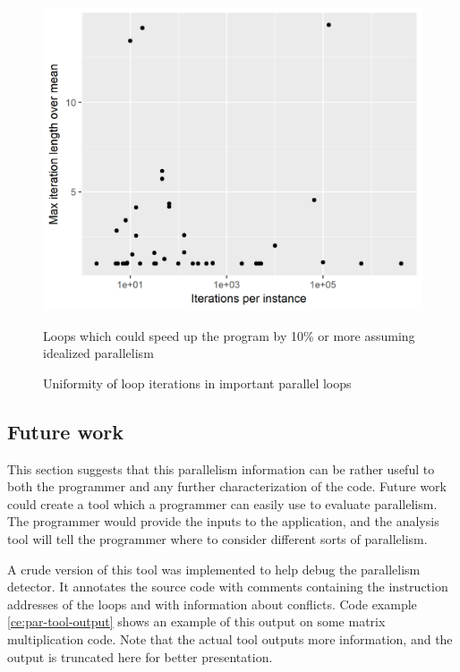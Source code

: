 \documentclass[12pt,twoside]{reedthesis}
\begin{document}
		\begin{figure}
			\caption{Uniformity of loop iterations in important parallel loops}
			\label{fig:uniformity-tail-etc}
			
			\begin{minipage}{0.6\textwidth} %
				\includegraphics[scale=0.7]{plots/tail_iters.png}
				{\footnotesize Loops which could speed up the program by 10\% or more assuming idealized parallelism \par}
			\end{minipage}
		\end{figure}
		
		
	\subsection{Future work}
		\label{s:par-fut-work}
		
		This section suggests that this parallelism information can be rather useful to both the programmer and any further characterization of the code. Future work could create a tool which a programmer can easily use to evaluate parallelism. The programmer would provide the inputs to the application, and the analysis tool will tell the programmer where to consider different sorts of parallelism.
		
		A crude version of this tool was implemented to help debug the parallelism detector. It annotates the source code with comments containing the instruction addresses of the loops and with information about conflicts. Code example \ref{ce:par-tool-output} shows an example of this output on some matrix multiplication code. Note that the actual tool outputs more information, and the output is truncated here for better presentation. 
		
\end{document}

